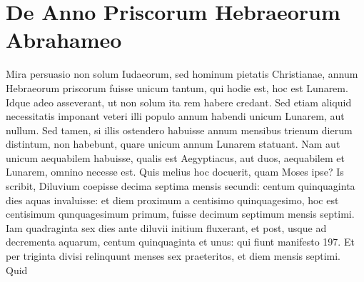 \section{De Anno Priscorum Hebraeorum Abrahameo}
Mira persuasio non solum Iudaeorum, sed hominum pietatis
Christianae, annum Hebraeorum priscorum fuisse unicum tantum,
qui hodie est, hoc est Lunarem.
Idque adeo asseverant, ut
non solum ita rem habere credant.
Sed etiam aliquid necessitatis imponant
veteri illi populo annum habendi unicum Lunarem, aut nullum.
Sed tamen, si illis ostendero habuisse annum mensibus trienum
dierum distintum, non habebunt, quare unicum annum Lunarem
statuant.
Nam aut unicum aequabilem habuisse, qualis est Aegyptiacus,
aut duos, aequabilem et Lunarem, omnino necesse est.
Quis melius hoc docuerit, quam Moses ipse?
Is scribit, Diluvium coepisse
decima septima mensis secundi: centum quinquaginta dies aquas
invaluisse: et diem proximum a centisimo quinquagesimo,
hoc est centisimum qunquagesimum primum, fuisse decimum
septimum mensis septimi.
%
Iam quadraginta sex dies ante diluvii initium
fluxerant, et post, usque ad decrementa aquarum, centum
quinquaginta et unus: qui fiunt manifesto 197.
Et per triginta divisi
relinquunt menses sex praeteritos, et diem  mensis septimi.
Quid



























